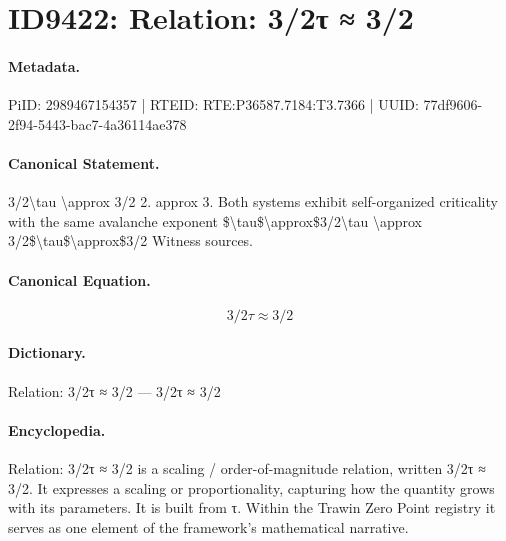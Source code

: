 \section*{ID9422: Relation: 3/2τ ≈ 3/2}
\paragraph{Metadata.}
PiID: 2989467154357 | RTEID: RTE:P36587.7184:T3.7366 | UUID: 77df9606-2f94-5443-bac7-4a36114ae378

\paragraph{Canonical Statement.}
3/2\textbackslash{}tau \textbackslash{}approx 3/2 2. approx 3. Both systems exhibit self-organized criticality with the same avalanche exponent \$\textbackslash{}tau\$\textbackslash{}approx\$3/2\textbackslash{}tau \textbackslash{}approx 3/2\$\textbackslash{}tau\$\textbackslash{}approx\$3/2 Witness sources.

\paragraph{Canonical Equation.}
\[
3/2\tau \approx 3/2
\]

\paragraph{Dictionary.}
Relation: 3/2τ ≈ 3/2 — 3/2τ ≈ 3/2

\paragraph{Encyclopedia.}
Relation: 3/2τ ≈ 3/2 is a scaling / order-of-magnitude relation, written 3/2τ ≈ 3/2. It expresses a scaling or proportionality, capturing how the quantity grows with its parameters. It is built from τ. Within the Trawin Zero Point registry it serves as one element of the framework's mathematical narrative.
